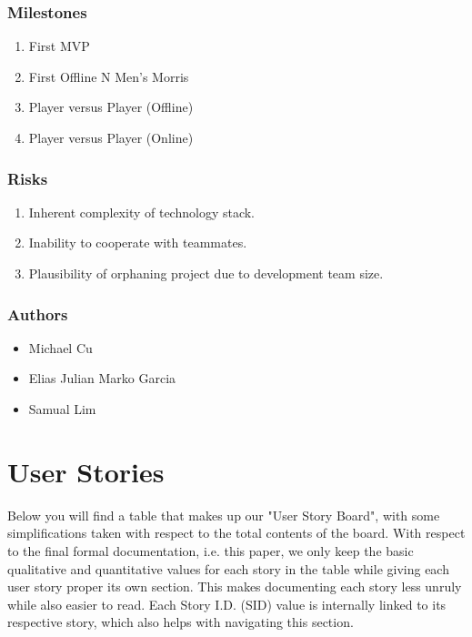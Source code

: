 \documentclass[11pt]{article}
\begin{document}
\subsubsection*{Milestones}
\label{sec:orgc02150c}
\begin{enumerate}
\item First MVP
\item First Offline N Men's Morris
\item Player versus Player (Offline)
\item Player versus Player (Online)
\end{enumerate}
\subsubsection*{Risks}
\label{sec:org3b1e498}
\begin{enumerate}
\item Inherent complexity of technology stack.
\item Inability to cooperate with teammates.
\item Plausibility of orphaning project due to development team size.
\end{enumerate}
\subsubsection*{Authors}
\label{sec:org8a66140}
\begin{itemize}
\item Michael Cu
\item Elias Julian Marko Garcia
\item Samual Lim
\end{itemize}
\section{User Stories}
\label{sec:org588b969}
Below you will find a table that makes up our "User Story Board", with some simplifications taken
with respect to the total contents of the board. With respect to the final formal documentation,
i.e. this paper, we only keep the basic qualitative and quantitative values for each story in the
table while giving each user story proper its own section. This makes documenting each story
less unruly while also easier to read. Each Story I.D. (SID) value is internally linked to its
respective story, which also helps with navigating this section.
\end{document}
